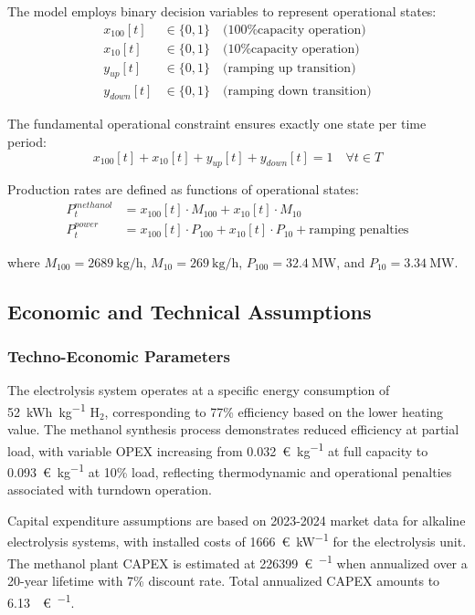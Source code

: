 \documentclass[12pt,a4paper]{article}
\begin{document}
The model employs binary decision variables to represent operational states:
\begin{align}
x_{100}[t] &\in \{0,1\} \quad \text{(100\% capacity operation)} \\
x_{10}[t] &\in \{0,1\} \quad \text{(10\% capacity operation)} \\
y_{up}[t] &\in \{0,1\} \quad \text{(ramping up transition)} \\
y_{down}[t] &\in \{0,1\} \quad \text{(ramping down transition)}
\end{align}

The fundamental operational constraint ensures exactly one state per time period:
\begin{equation}
x_{100}[t] + x_{10}[t] + y_{up}[t] + y_{down}[t] = 1 \quad \forall t \in T
\end{equation}

Production rates are defined as functions of operational states:
\begin{align}
P_t^{methanol} &= x_{100}[t] \cdot M_{100} + x_{10}[t] \cdot M_{10} \\
P_t^{power} &= x_{100}[t] \cdot P_{100} + x_{10}[t] \cdot P_{10} + \text{ramping penalties}
\end{align}

where $M_{100} = \SI{2689}{\kg\per\hour}$, $M_{10} = \SI{269}{\kg\per\hour}$, $P_{100} = \SI{32.4}{\mega\watt}$, and $P_{10} = \SI{3.34}{\mega\watt}$.

\subsection{Economic and Technical Assumptions}

\subsubsection{Techno-Economic Parameters}

The electrolysis system operates at a specific energy consumption of \SI{52}{\kWh\per\kg} H$_2$, corresponding to 77\% efficiency based on the lower heating value. The methanol synthesis process demonstrates reduced efficiency at partial load, with variable OPEX increasing from \SI{0.032}{\euro\per\kg} at full capacity to \SI{0.093}{\euro\per\kg} at 10\% load, reflecting thermodynamic and operational penalties associated with turndown operation.

Capital expenditure assumptions are based on 2023-2024 market data for alkaline electrolysis systems, with installed costs of \SI{1666}{\euro\per\kW} for the electrolysis unit. The methanol plant CAPEX is estimated at \SI{226399}{\euro\per\year} when annualized over a 20-year lifetime with 7\% discount rate. Total annualized CAPEX amounts to \SI{6.13}{\mega\euro\per\year}.
\end{document}
